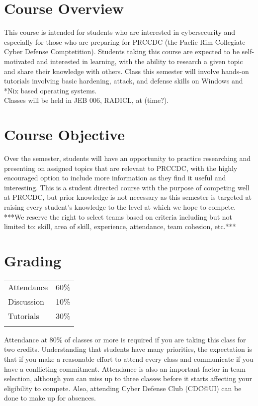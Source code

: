 \documentclass{article}
\begin{document}
\section*{Course Overview}
This course is intended for students who are interested in cybersecurity and especially for those who are preparing for PRCCDC (the Pacfic Rim Collegiate Cyber Defense Comptetition). Students taking this course are expected to be self-motivated and interested in learning, with the ability to research a given topic and share their knowledge with others. Class this semester will involve hands-on tutorials involving basic hardening, attack, and defense skills on Windows and *Nix based operating systems.\\

Classes will be held in JEB 006, RADICL, at (time?).

\section*{Course Objective}
Over the semester, students will have an opportunity to practice researching and presenting on assigned topics that are relevant to PRCCDC, with the highly encouraged option to include more information as they find it useful and interesting. This is a student directed course with the purpose of competing well at PRCCDC, but prior knowledge is not necessary as this semester is targeted at raising every student's knowledge to the level at which we hope to compete.\\

***We reserve the right to select teams based on criteria including but not limited to: skill, area of skill, experience, attendance, team cohesion, etc.***


\section*{Grading}

\begin{tabular}{l  l}
Attendance & 60\% \\
Discussion & 10\% \\
Tutorials & 30\% \\\\
\end{tabular}

\noindent Attendance at 80\% of classes or more is required if you are taking this class for two credits. Understanding that students have many priorities, the expectation is that if you make a reasonable effort to attend every class and communicate if you have a conflicting commitment. Attendance is also an important factor in team selection, although you can miss up to three classes before it starts affecting your eligibility to compete. Also, attending Cyber Defense Club (CDC@UI) can be done to make up for absences. \\
\end{document}
